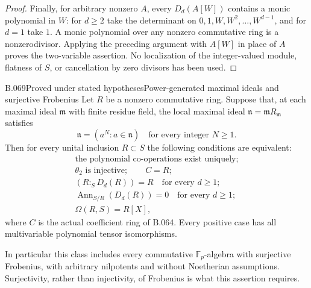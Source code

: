\begin{proof}
Finally, for arbitrary nonzero $A$, every $D_d(A[W])$ contains a monic
polynomial in $W$: for $d\ge2$ take the determinant on
$0,1,W,W^2,\ldots,W^{d-1}$, and for $d=1$ take $1$.
A monic polynomial over any nonzero commutative ring is a
nonzerodivisor. Applying the preceding argument with $A[W]$ in place
of $A$ proves the two-variable assertion. No localization of the
integer-valued module, flatness of $S$, or cancellation by zero divisors
has been used.
\end{proof}

\begin{saresult}{B.069}{Proved under stated hypotheses}{Power-generated maximal ideals and surjective Frobenius}
Let $R$ be a nonzero commutative ring. Suppose that, at each maximal ideal
$\mathfrak m$ with finite residue field, the local maximal ideal
$\mathfrak n=\mathfrak mR_{\mathfrak m}$ satisfies
\[
             \mathfrak n=(a^N:a\in\mathfrak n)
             \quad\text{for every integer }N\ge1.          \tag{B69.1}
\]
Then for every unital inclusion $R\subset S$ the following conditions
are equivalent:
\[
\begin{gathered}
 \text{the polynomial co-operations exist uniquely};\\
 \theta_2\text{ is injective};\qquad C=R;\\
 (R:_S D_d(R))=R\quad\text{for every }d\ge1;\\
 \operatorname{Ann}_{S/R}(D_d(R))=0\quad\text{for every }d\ge1;\\
 \Omega(R,S)=R[X],                                        \tag{B69.2}
\end{gathered}
\]
where $C$ is the actual coefficient ring of B.064. Every positive case
has all multivariable polynomial tensor isomorphisms.

In particular this class includes every commutative $\mathbb F_p$-algebra
with surjective Frobenius, with arbitrary nilpotents and without
Noetherian assumptions. Surjectivity, rather than injectivity, of
Frobenius is what this assertion requires.
\end{saresult}
